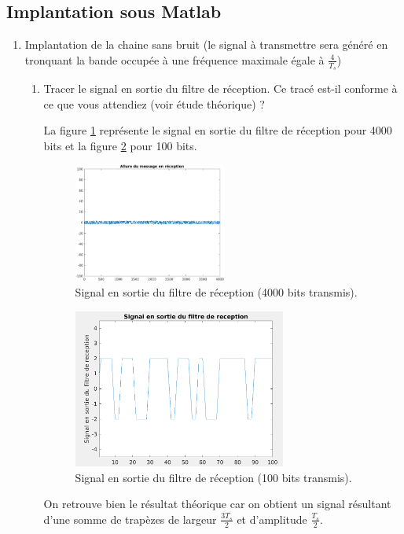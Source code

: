 \documentclass[frenchb]{article}
\begin{document}
\subsection{Implantation sous Matlab}
    \begin{enumerate}
        \item Implantation de la chaine sans bruit (le signal à transmettre sera généré en tronquant la bande occupée à une fréquence maximale égale à $\frac{4}{T_s}$)
            \begin{enumerate}
                \item Tracer le signal en sortie du filtre de réception. Ce tracé est-il conforme à ce que vous attendiez (voir étude théorique) ?
                
                 \par\leavevmode\par
                 \setlength\parindent{0.5cm}
                 La figure \ref{fig : C2F1} représente  le signal en sortie du filtre de réception pour 4000 bits et la figure \ref{fig : C2F12} pour 100 bits.
        
                 \begin{figure}[ht!]
		         \centering
		         \includegraphics[width=5cm]{C2F1.png}		              			     \caption{Signal en sortie du filtre de réception (4000 bits transmis). \label{fig : C2F1}}
		         \end{figure}
		         
		         \begin{figure}[ht!]
		         \centering
		         \includegraphics[width=7cm]{C2F12.png}		              			     \caption{Signal en sortie du filtre de réception (100 bits transmis). \label{fig : C2F12}}
		         \end{figure}
				 \newpage
				 On retrouve bien le résultat théorique car on obtient un signal résultant d'une somme de trapèzes de largeur $\frac{3 T_s}{2}$ et d'amplitude $\frac{T_s}{2}$.
				 

\end{enumerate}
\end{enumerate}
\end{document}
